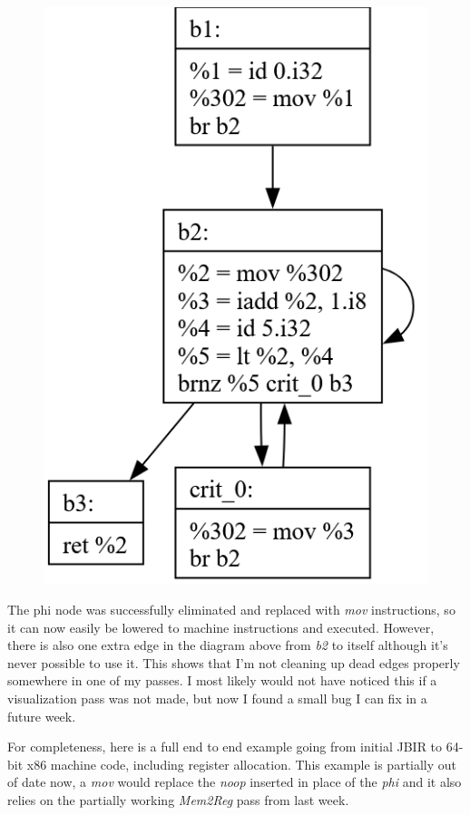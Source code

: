\documentclass[11pt, a4paper, titlepage]{article}
\begin{document}
\begin{figure}[H]
  \centering
  \includegraphics[scale=0.3]{images/i3.png}
\end{figure}

The phi node was successfully eliminated and replaced with \textit{mov} instructions,
so it can now easily be lowered to machine instructions and executed.
However, there is also one extra edge in the diagram above from \textit{b2} to itself although it's never possible to use it.
This shows that I'm not cleaning up dead edges properly somewhere in one of my passes.
I most likely would not have noticed this if a visualization pass was not made, but now I found a small bug I can fix in a future week.

For completeness, here is a full end to end example going from initial JBIR to 64-bit x86 machine code, including register allocation.
This example is partially out of date now, a \textit{mov} would replace the \textit{noop} inserted in place of the \textit{phi} and it also relies on the partially working \textit{Mem2Reg} pass from last week.
\end{document}
